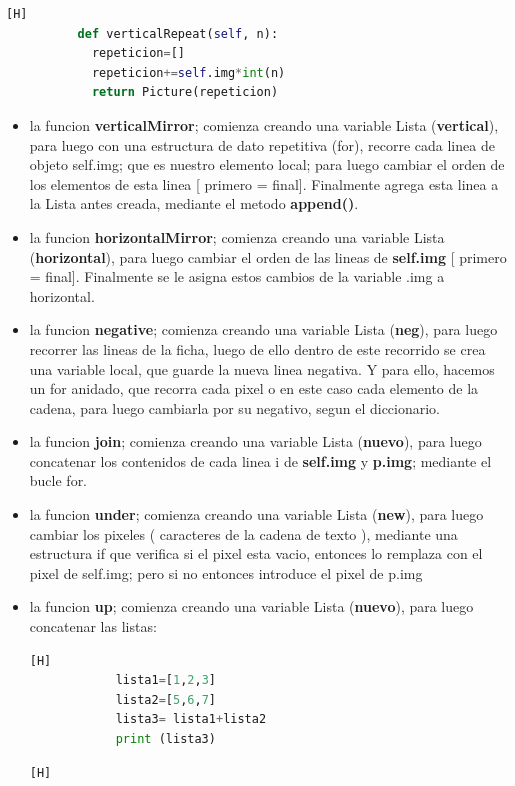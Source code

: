 \documentclass{article}
\begin{document}
\begin{itemize}
\begin{lstlisting}[language=python,caption={Clase Picture}][H]
          def verticalRepeat(self, n):
            repeticion=[]
            repeticion+=self.img*int(n)
            return Picture(repeticion)
    \end{lstlisting}
	\begin{itemize}
	    \item la funcion \textbf{verticalMirror}; comienza creando una variable Lista (\textbf{vertical}), para luego con una estructura de dato repetitiva (for), recorre cada linea de objeto self.img; que es nuestro elemento local; para luego cambiar el orden de los elementos de esta linea [ primero = final]. Finalmente agrega esta linea a la Lista antes creada, mediante el metodo \textbf{append()}.
        \item la funcion \textbf{horizontalMirror}; comienza creando una variable Lista (\textbf{horizontal}), para luego cambiar el orden de las lineas de \textbf{self.img} [ primero = final]. Finalmente se le asigna estos cambios de la variable .img a horizontal.
        \item la funcion \textbf{negative}; comienza creando una variable Lista (\textbf{neg}), para luego recorrer las lineas de la ficha, luego de ello dentro de este recorrido se crea una variable local, que guarde la nueva linea negativa. Y para ello, hacemos un for anidado, que recorra cada pixel o en este caso cada elemento de la cadena, para luego cambiarla por su negativo, segun el diccionario.
        \item la funcion \textbf{join}; comienza creando una variable Lista (\textbf{nuevo}), para luego concatenar los contenidos de cada linea i de \textbf{self.img} y \textbf{p.img}; mediante el bucle for.
        \item la funcion \textbf{under}; comienza creando una variable Lista (\textbf{new}), para luego cambiar los pixeles ( caracteres de la cadena de texto ), mediante una estructura if que verifica si el pixel esta vacio, entonces lo remplaza con el pixel de self.img; pero si no entonces introduce el pixel de p.img
        \item la funcion \textbf{up}; comienza creando una variable Lista (\textbf{nuevo}), para luego concatenar las listas:
        \begin{lstlisting}[language=python,caption={Codigo de ejemplo}][H]
            lista1=[1,2,3]
            lista2=[5,6,7]
            lista3= lista1+lista2
            print (lista3)
        \end{lstlisting}
        \begin{lstlisting}[language=python,caption={Resultado de Consola}][H]

\end{lstlisting}
\end{itemize}
\end{itemize}
\end{document}

